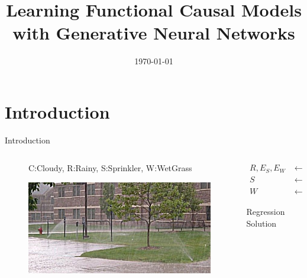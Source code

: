 \documentclass{beamer}
\title[CGNN]{Learning Functional Causal Models with Generative Neural Networks}
\author[Dogan]
{%
	\texorpdfstring{
		\begin{columns}
			\column{.45\linewidth}
			\centering
			Presented by:\\
			Haluk Dogan\\
			\url{https://haluk.github.io/}\\
			\href{mailto:hdogan@vivaldi.net}{hdogan@vivaldi.net}
		\end{columns}
	}
	{Dogan}
}
\institute[UNL] %
{
	Department of Computer Science\\
	University of Nebraska-Lincoln
}
\date[\today] %
{\today}
\begin{document}
\begin{frame}
	\titlepage{}
\end{frame}

\section{Introduction}
\begin{frame}{Introduction}
	\begin{columns}
		\begin{column}{.48\textwidth}
			\begin{figure}[ht]
				\centering
				
				\caption*{\tiny{C:\@ Cloudy, R:\@ Rainy, S:\@ Sprinkler, W:\@ WetGrass}\label{fig:weather-bn}}
			\end{figure}
			\vspace{-0.5cm}
			\begin{figure}[ht]
				\centering
				\includegraphics[width=1\textwidth, keepaspectratio]{img/sprinklerrain.jpg}
				\caption*{\label{fig:sprinkler-rain}}
			\end{figure}
		\end{column}
		\begin{column}{.48\textwidth}
			\begin{align*}
				R, E_{S}, E_{W} & \leftarrow U(0,1)       \\
				S               & \leftarrow 0.5R + E_{S} \\
				W               & \leftarrow S + E_{W}
			\end{align*}
			\begin{center}
			\end{center}
			\vspace{-0.5cm}
			\tiny{
				\begin{block}{Regression Solution}

\end{block}}
\end{column}
\end{columns}
\end{frame}
\end{document}
